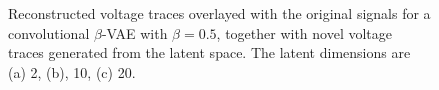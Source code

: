 \begin{figure}[!htb]
\caption{Reconstructed voltage traces overlayed with the original signals for a convolutional $\beta$-VAE with $\beta=0.5$, together with novel voltage traces generated from the latent space. The latent dimensions are (a) 2, (b), 10, (c) 20.}
\label{fig:hh_conv_vae_beta_0_5}
\end{figure}

\begin{figure}[!htb]
\centering
{}
\qquad
{}
\qquad

\end{figure}
